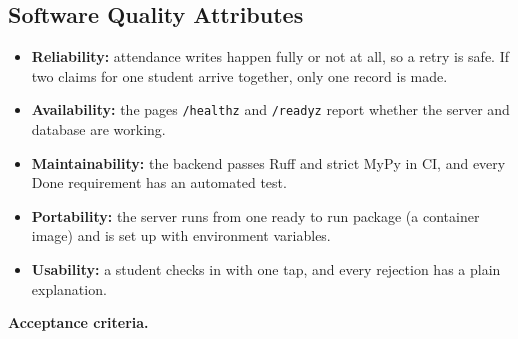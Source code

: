 \hypertarget{software-quality-attributes}{%
\subsection{Software Quality Attributes}\label{software-quality-attributes}}

\begin{itemize}
\tightlist
\item
  \textbf{Reliability:} attendance writes happen fully or not at all, so a retry is safe. If two claims for one student arrive together, only one record is made.
\item
  \textbf{Availability:} the pages \texttt{/healthz} and \texttt{/readyz} report whether the server and database are working.
\item
  \textbf{Maintainability:} the backend passes Ruff and strict MyPy in CI, and every Done requirement has an automated test.
\item
  \textbf{Portability:} the server runs from one ready to run package (a container image) and is set up with environment variables.
\item
  \textbf{Usability:} a student checks in with one tap, and every rejection has a plain explanation.
\end{itemize}

\textbf{Acceptance criteria.}

